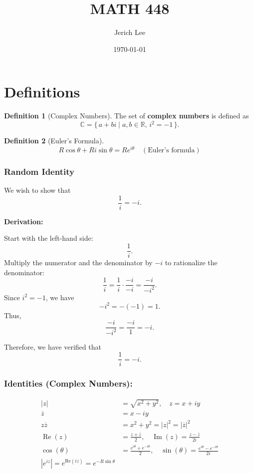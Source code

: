 \documentclass[12pt]{article}
\title{MATH 448}
\author{Jerich Lee}
\date{\today}
\theoremstyle{definition} %
\newtheorem{definition}{Definition}
\theoremstyle{plain} %
\begin{document}
\maketitle

\section{Definitions}

\begin{definition}[Complex Numbers]
The set of \textbf{complex numbers} is defined as
\[
\mathbb{C} = \{\, a + bi \mid a,b \in \mathbb{R}, \, i^2 = -1 \,\}.
\]
\end{definition}

\begin{definition}[Euler's Formula]
    $$    
    R\cos\theta + Ri\sin\theta = Re^{i\theta} \quad (\text{Euler's formula})  
    $$
\end{definition}
\subsubsection*{Random Identity}
We wish to show that
\[
\frac{1}{i} = -i.
\]

\textbf{Derivation:}

Start with the left-hand side:
\[
\frac{1}{i}.
\]
Multiply the numerator and the denominator by \(-i\) to rationalize the denominator:
\[
\frac{1}{i} = \frac{1}{i} \cdot \frac{-i}{-i} = \frac{-i}{-i^2}.
\]
Since \(i^2 = -1\), we have
\[
-i^2 = -(-1) = 1.
\]
Thus,
\[
\frac{-i}{-i^2} = \frac{-i}{1} = -i.
\]

Therefore, we have verified that
\[
\frac{1}{i} = -i.
\]


\subsubsection*{Identities (Complex Numbers):}

\begin{align}
|z| &= \sqrt{x^2 + y^2}, \quad z = x + iy \\
\overline{z} &= x - iy \\
z\overline{z} &= x^2 + y^2 = |z|^2 = |\overline{z}|^2 \\
\operatorname{Re}(z) &= \frac{z + \overline{z}}{2}, \quad \operatorname{Im}(z) = \frac{z - \overline{z}}{2i} \\
\cos(\theta) &= \frac{e^{i\theta} + e^{-i\theta}}{2}, \quad \sin(\theta) = \frac{e^{i\theta} - e^{-i\theta}}{2i} \\
\left\vert e^{iz} \right\vert = e^{\text{Re}(iz) }= e^{-R\sin \theta}
\end{align}
\end{document}
